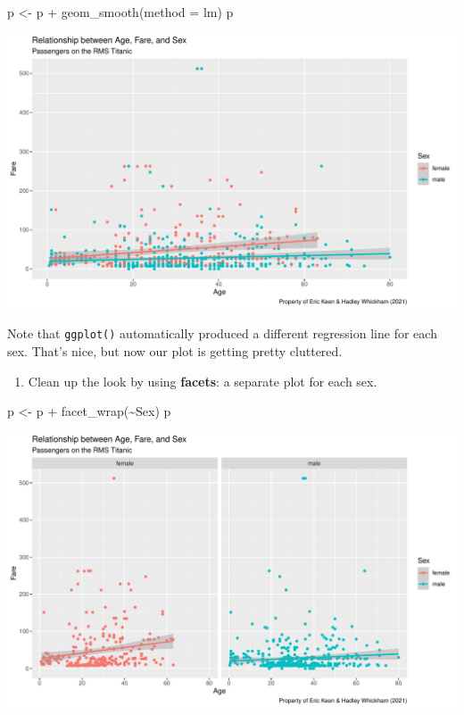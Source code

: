 \documentclass[
]{book}
\newenvironment{Shaded}{\begin{snugshade}}{\end{snugshade}}
\newcommand{\AttributeTok}[1]{\textcolor[rgb]{0.77,0.63,0.00}{#1}}
\newcommand{\FunctionTok}[1]{\textcolor[rgb]{0.00,0.00,0.00}{#1}}
\newcommand{\NormalTok}[1]{#1}
\newcommand{\OtherTok}[1]{\textcolor[rgb]{0.56,0.35,0.01}{#1}}
\newcommand{\SpecialCharTok}[1]{\textcolor[rgb]{0.00,0.00,0.00}{#1}}
\newcommand{\StringTok}[1]{\textcolor[rgb]{0.31,0.60,0.02}{#1}}
\providecommand{\tightlist}{%
  \setlength{\itemsep}{0pt}\setlength{\parskip}{0pt}}
\begin{document}
\begin{Shaded}
\begin{Highlighting}[]
\NormalTok{p }\OtherTok{\textless{}{-}}\NormalTok{ p }\SpecialCharTok{+} \FunctionTok{geom\_smooth}\NormalTok{(}\AttributeTok{method =} \StringTok{\textquotesingle{}lm\textquotesingle{}}\NormalTok{)}
\NormalTok{p}
\end{Highlighting}
\end{Shaded}

\includegraphics{figures/unnamed-chunk-159-1.pdf}

Note that \texttt{ggplot()} automatically produced a different regression line for each sex. That's nice, but now our plot is getting pretty cluttered.

\begin{enumerate}
\def\labelenumi{(\arabic{enumi})}
\setcounter{enumi}{6}
\tightlist
\item
  Clean up the look by using \textbf{facets}: a separate plot for each sex.
\end{enumerate}

\begin{Shaded}
\begin{Highlighting}[]
\NormalTok{p }\OtherTok{\textless{}{-}}\NormalTok{ p }\SpecialCharTok{+} \FunctionTok{facet\_wrap}\NormalTok{(}\SpecialCharTok{\textasciitilde{}}\NormalTok{Sex)}
\NormalTok{p}
\end{Highlighting}
\end{Shaded}

\includegraphics{figures/unnamed-chunk-160-1.pdf}
\end{document}
